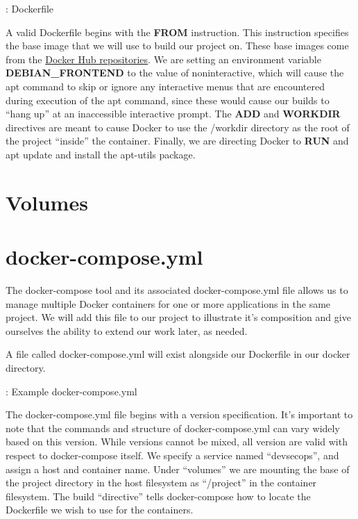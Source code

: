\justify{}
\begin{mybox}{\thetcbcounter: Dockerfile}
  
\end{mybox}

\justify{}
A valid Dockerfile begins with the \textbf{FROM} instruction. This instruction specifies the base image that we
will use to build our project on. These base images come from the
\href{https://docs.docker.com/docker-hub/repos/}{Docker Hub repositories}. We are setting an environment variable
\textbf{DEBIAN\_FRONTEND} to the value of noninteractive, which will cause the apt command to skip or ignore any
interactive menus that are encountered during execution of the apt command, since these would cause
our builds to ``hang up'' at an inaccessible interactive prompt. The \textbf{ADD} and \textbf{WORKDIR} directives
are meant to cause Docker to use the /workdir directory as the root of the project ``inside'' the
container. Finally, we are directing Docker to \textbf{RUN} and apt update and install the apt-utils package.

\section{Volumes}

\section{docker-compose.yml}
\justify{}
The docker-compose tool and its associated docker-compose.yml file allows us to manage multiple Docker containers for
one or more applications in the same project. We will add this file to our project to illustrate it's
composition and give ourselves the ability to extend our work later, as needed.

\justify{}
A file called docker-compose.yml will exist
alongside our Dockerfile in our docker directory.

\begin{mybox}{\thetcbcounter: Example docker-compose.yml}
  
\end{mybox}

\justify{}
The docker-compose.yml file begins with a version specification. It's important to note that the commands and structure
of docker-compose.yml can vary widely based on this version. While versions cannot be mixed, all version are valid with
respect to docker-compose itself. We specify a service named ``devsecops'', and assign a host and container name. Under
``volumes'' we are mounting the base of the project directory in the host
filesystem as ``/project'' in the container filesystem. The build
``directive'' tells docker-compose how to locate the Dockerfile we wish to use for the containers.

